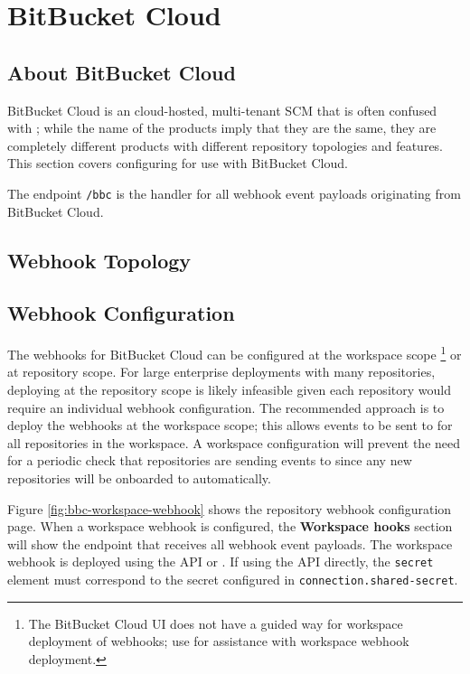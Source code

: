 \chapter{BitBucket Cloud}\label{sec:bbc}


\section{About BitBucket Cloud}

BitBucket Cloud is an cloud-hosted, multi-tenant SCM that is often confused with ;
while the name of the products imply that they are the same, they are completely different products
with different repository topologies and features. This section covers configuring \cxoneflow
for use with BitBucket Cloud.

The \cxoneflow endpoint \texttt{/bbc} is the handler for all webhook event
payloads originating from BitBucket Cloud.  

\section{Webhook Topology}




\section{Webhook Configuration}

The webhooks for BitBucket Cloud can be configured at the workspace scope
\footnote{The BitBucket Cloud UI does not have a guided way for workspace deployment of webhooks;
use \cxoneflowaudit for assistance with workspace webhook deployment.} or at repository scope.
For large enterprise deployments with many repositories, deploying at the repository scope
is likely infeasible given each repository would require an individual webhook configuration.
The recommended approach is to deploy the webhooks at the workspace scope;
this allows events to be sent to \cxoneflow for all repositories in the workspace.
A workspace configuration will prevent the need for a periodic check that repositories are sending
events to \cxoneflow since any new repositories will be onboarded to \cxoneflow automatically.


Figure \ref{fig:bbc-workspace-webhook} shows the repository webhook configuration page.  When a
workspace webhook is configured, the \textbf{Workspace hooks} section will show the endpoint
that receives all webhook event payloads.  The workspace webhook is deployed using the
API or \cxoneflowauditns. If using the API directly, the \texttt{secret} element must correspond to the
secret configured in \texttt{connection.shared-secret}.


